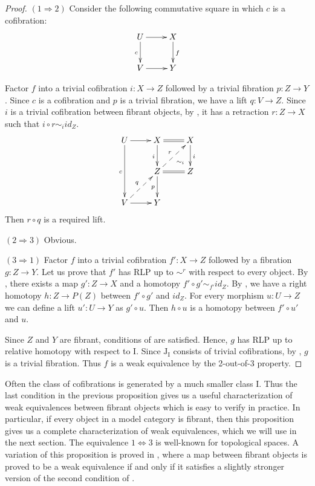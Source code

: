 \documentclass{tac}
\theoremstyle{definition}
\newcommand{\I}{\mathrm{I}}
\newcommand{\J}{\mathrm{J}}
\begin{document}
\begin{proof}
$(1 \Rightarrow 2)$
Consider the following commutative square in which $c$ is a cofibration:
\[ \xymatrix{ U \ar[r] \ar[d]_c & X \ar[d]^f \\
              V \ar[r]          & Y
            } \]

Factor $f$ into a trivial cofibration $i : X \to Z$ followed by a trivial fibration $p : Z \to Y$.
Since $c$ is a cofibration and $p$ is a trivial fibration, we have a lift $q : V \to Z$.
Since $i$ is a trivial cofibration between fibrant objects, by , it has a retraction $r : Z \to X$ such that $i \circ r \sim_i id_Z$.
\[ \xymatrix{ U \ar[r] \ar[dd]_c        & X \ar[d]_i \ar@{=}[r] \ar@{}[dr]|(.7){\sim_i} & X \ar[d]^i \\
                                        & Z \ar[d]_p \ar@{=}[r] \ar@{-->}[ur]^r         & Z          \\
              V \ar[r] \ar@{-->}[ur]^q  & Y                                             &
            } \]
Then $r \circ q$ is a required lift.

$(2 \Rightarrow 3)$ Obvious.

$(3 \Rightarrow 1)$
Factor $f$ into a trivial cofibration $f' : X \to Z$ followed by a fibration $g : Z \to Y$.
Let us prove that $f'$ has RLP up to $\sim^r$ with respect to every object.
By , there exists a map $g' : Z \to X$ and a homotopy $f' \circ g' \sim_{f'} id_Z$.
By , we have a right homotopy $h : Z \to P(Z)$ between $f' \circ g'$ and $id_Z$.
For every morphism $u : U \to Z$ we can define a lift $u' : U \to Y$ as $g' \circ u$.
Then $h \circ u$ is a homotopy between $f' \circ u'$ and $u$.

Since $Z$ and $Y$ are fibrant, conditions of  are satisfied.
Hence, $g$ has RLP up to relative homotopy with respect to $\I$.
Since $\J_\I$ consists of trivial cofibrations, by , $g$ is a trivial fibration.
Thus $f$ is a weak equivalence by the 2-out-of-3 property.
\end{proof}

Often the class of cofibrations is generated by a much smaller class $\I$.
Thus the last condition in the previous proposition gives us a useful characterization of weak equivalences between fibrant objects which is easy to verify in practice.
In particular, if every object in a model category is fibrant, then this proposition gives us a complete characterization of weak equivalences, which we will use in the next section.
The equivalence $1 \Leftrightarrow 3$ is well-known for topological spaces.
A variation of this proposition is proved in \cite{vogt-we},
where a map between fibrant objects is proved to be a weak equivalence if and only if it satisfies a slightly stronger version of the second condition of .
\end{document}
